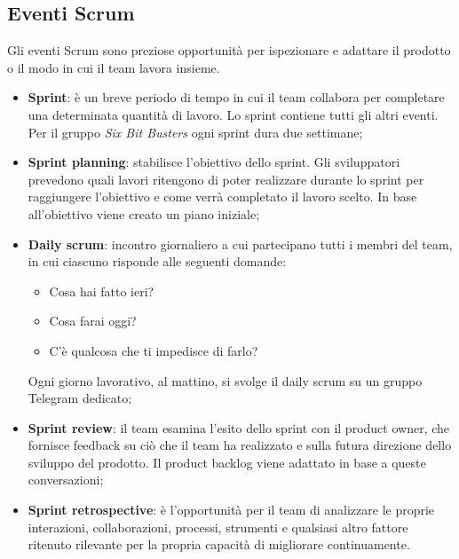 \subsection{Eventi Scrum}
Gli eventi Scrum sono preziose opportunità per ispezionare e adattare il
prodotto o il modo in cui il team lavora insieme.
\begin{itemize}
    \item \textbf{Sprint}: è un breve periodo di tempo in cui il team collabora per
          completare una determinata quantità di lavoro. Lo sprint contiene tutti gli altri eventi.
          Per il gruppo \textit{Six Bit Busters} ogni sprint dura due settimane;
    \item \textbf{Sprint planning}: stabilisce l'obiettivo dello sprint.
          Gli sviluppatori prevedono quali lavori ritengono di poter realizzare durante
          lo sprint per raggiungere l'obiettivo e come verrà completato il lavoro scelto.
          In base all'obiettivo viene creato un piano iniziale;
    \item \textbf{Daily scrum}: incontro giornaliero a cui partecipano tutti i membri del team,
          in cui ciascuno risponde alle seguenti domande:
          \begin{itemize}
              \item Cosa hai fatto ieri?
              \item Cosa farai oggi?
              \item C'è qualcosa che ti impedisce di farlo?
          \end{itemize}
          Ogni giorno lavorativo, al mattino, si svolge il daily scrum su un gruppo Telegram dedicato;
    \item \textbf{Sprint review}: il team esamina l'esito dello sprint con il
          product owner, che fornisce feedback su ciò che il team ha realizzato
          e sulla futura direzione dello sviluppo del prodotto. Il product backlog
          viene adattato in base a queste conversazioni;
    \item \textbf{Sprint retrospective}: è l'opportunità per il team di analizzare le
          proprie interazioni, collaborazioni, processi, strumenti e qualsiasi altro fattore
          ritenuto rilevante per la propria capacità di migliorare continuamente.
\end{itemize}


